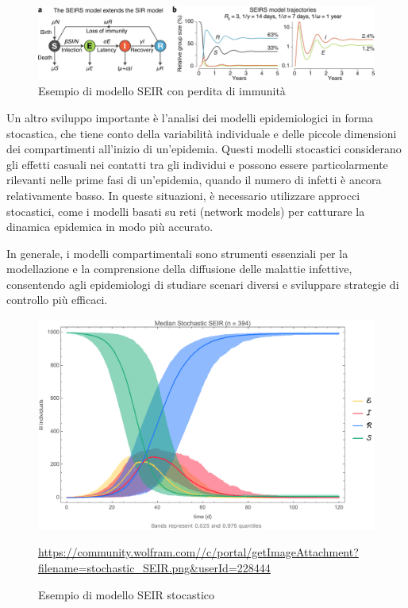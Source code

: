 \begin{figure}[H]
    \begin{center}
        \includegraphics[width=\textwidth]{img/41592_2020_856_Fig1_HTML.png}
        \caption{Esempio di modello SEIR con perdita di immunità \cite{Bjornstad2020}}
        \label{fig:SEIRS_model}
    \end{center}
\end{figure}

Un altro sviluppo importante è l'analisi dei modelli epidemiologici in 
forma stocastica, che tiene conto della variabilità individuale e delle 
piccole dimensioni dei compartimenti all'inizio di un'epidemia. 
Questi modelli stocastici considerano gli effetti casuali nei contatti 
tra gli individui e possono essere particolarmente rilevanti nelle prime 
fasi di un'epidemia, quando il numero di infetti è ancora relativamente 
basso. In queste situazioni, è necessario utilizzare approcci stocastici, 
come i modelli basati su reti (network models) per catturare la dinamica 
epidemica in modo più accurato.

In generale, i modelli compartimentali sono strumenti essenziali per la 
modellazione e la comprensione della diffusione delle malattie infettive, 
consentendo agli epidemiologi di studiare scenari diversi e sviluppare 
strategie di controllo più efficaci.

\begin{figure}[H]
    \begin{center}
        \includegraphics[width=\textwidth]{img/stochastic_SEIR.png}
        \caption{Esempio di modello SEIR stocastico}
        \url{https://community.wolfram.com//c/portal/getImageAttachment?filename=stochastic_SEIR.png&userId=228444}
        \label{fig:stochastic_SEIR_model}
    \end{center}
\end{figure}